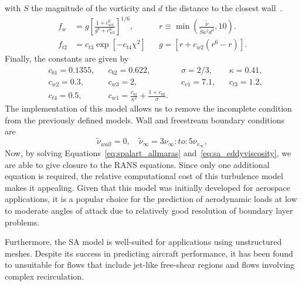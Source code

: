 with $S$ the magnitude of the vorticity and $d$ the distance to the closest wall~\cite{spalartOneequationTurbulenceModel1992}. 
\begin{align}
    f_w&=g
    \left[\frac{1+c_{w3}^6}{g^6+c_{w3}^6}\right]^{1/6},& &r\equiv \min\left(\frac{\tilde\nu}{\tilde S \kappa^2 d^2},10\right). \\
    f_{t2}&=c_{t3} \exp \left[-c_{t4}\chi^2\right] & &g=\left[r+c_{w2}\left(r^6-r\right)\right].
\end{align}
Finally, the constants are given by 
\begin{align}
    &c_{b1} = 0.1355,& &c_{b2} =0.622,& &\sigma = 2/3,& &\kappa=0.41, \\
    &c_{w2} = 0.3,&    &c_{w3} =2,&     &c_{v1} = 7.1,&   &c_{t3}=1.2,  \\
    &c_{t4} = 0.5,&      &c_{w1} = \frac{c_{b1}}{\kappa^2} + \frac{1+c_{b2}}{\sigma}.
\end{align}
The implementation of this model allows us to remove the incomplete condition from the previously defined models. Wall and freestream boundary conditions are~\cite{rumseyRecentDevelopmentsTurbulence2015}
\begin{equation}
    \tilde \nu_{wall} = 0,\quad \tilde\nu_{\infty}=3 \nu_{\infty}:to:5\nu_{v_\infty},
\end{equation}
Now, by solving Equations~\ref{eq:spalart_allmaras} and~\ref{eq:sa_eddyviscosity}, we are able to give closure to the RANS equations. Since only one additional equation is required, the relative computational cost of this turbulence model makes it appealing. Given that this model was initially developed for aerospace applications, it is a popular choice for the prediction of aerodynamic loads at low to moderate angles of attack due to relatively good resolution of boundary layer problems. 

Furthermore, the SA model is well-suited for applications using unstructured meshes. Despite its success in predicting aircraft performance, it has been found to unsuitable for flows that include jet-like free-shear regions and flows involving complex recirculation.
